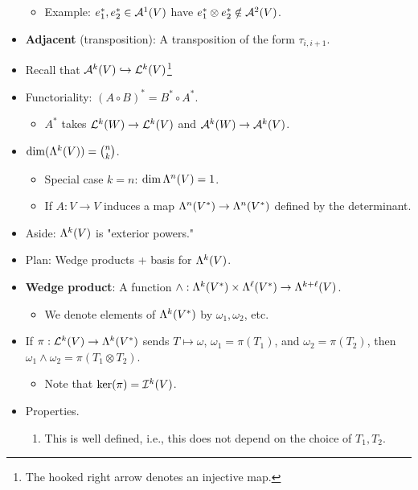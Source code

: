\documentclass[../notes.tex]{subfiles}
\begin{document}
\begin{itemize}
    \begin{itemize}
        \item Example: $e_1^*,e_2^*\in\alt[1]{V}$ have $e_1^*\otimes e_2^*\notin\alt[2]{V}$.
    \end{itemize}
    \item \textbf{Adjacent} (transposition): A transposition of the form $\tau_{i,i+1}$.
    \item {}Recall that $\alt[k]{V}\hookrightarrow\lin[k]{V}$\footnote{The hooked right arrow denotes an injective map.}
    \item Functoriality: $(A\circ B)^*=B^*\circ A^*$.
    \begin{itemize}
        \item $A^*$ takes $\lin[k]{W}\to\lin[k]{V}$ and $\alt[k]{W}\to\alt[k]{V}$.
    \end{itemize}
    \item $\dim(\lam[k]{V})=\binom{n}{k}$.
    \begin{itemize}
        \item Special case $k=n$: $\dim\lam[n]{V}=1$.
        \item If $A:V\to V$ induces a map $\lam[n]{V^*}\to\lam[n]{V^*}$ defined by the determinant.
    \end{itemize}
    \item Aside: $\lam[k]{V}$ is "exterior powers."
    \item Plan: Wedge products + basis for $\lam[k]{V}$.
    \item \textbf{Wedge product}: A function $\wedge:\lam[k]{V^*}\times\lam[\ell]{V^*}\to\lam[k+\ell]{V}$. 
    \begin{itemize}
        \item We denote elements of $\lam[k]{V^*}$ by $\omega_1,\omega_2$, etc.
    \end{itemize}
    \item If $\pi:\lin[k]{V}\to\lam[k]{V^*}$ sends $T\mapsto\omega$, $\omega_1=\pi(T_1)$, and $\omega_2=\pi(T_2)$, then $\omega_1\wedge\omega_2=\pi(T_1\otimes T_2)$.
    \begin{itemize}
        \item Note that $\ker(\pi)=\ide[k]{V}$.
    \end{itemize}
    \item Properties.
    \begin{enumerate}
        \item This is well defined, i.e., this does not depend on the choice of $T_1,T_2$.
        \begin{itemize}

\end{itemize}
\end{enumerate}
\end{itemize}
\end{document}
